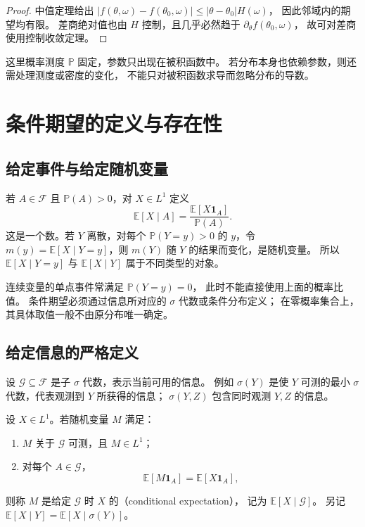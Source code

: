 \documentclass[UTF8]{ctexart}
\begin{document}
\begin{proof}
中值定理给出
$|f(\theta,\omega)-f(\theta_0,\omega)|\leq|\theta-\theta_0|H(\omega)$，
因此邻域内的期望均有限。
差商绝对值也由 $H$ 控制，且几乎必然趋于 $\partial_\theta f(\theta_0,\omega)$，
故可对差商使用控制收敛定理。
\end{proof}

这里概率测度 $\mathbb P$ 固定，参数只出现在被积函数中。
若分布本身也依赖参数，则还需处理测度或密度的变化，
不能只对被积函数求导而忽略分布的导数。

\section{条件期望的定义与存在性}
\label{sec:conditional-definition}

\subsection{给定事件与给定随机变量}

若 $A\in\mathcal F$ 且 $\mathbb P(A)>0$，对 $X\in L^1$ 定义
\[
  \mathbb E[X\mid A]
  =\frac{\mathbb E[X\mathbf1_A]}{\mathbb P(A)}.
\]
这是一个数。若 $Y$ 离散，对每个 $\mathbb P(Y=y)>0$ 的 $y$，令
$m(y)=\mathbb E[X\mid Y=y]$，则 $m(Y)$ 随 $Y$ 的结果而变化，是随机变量。
所以 $\mathbb E[X\mid Y=y]$ 与 $\mathbb E[X\mid Y]$ 属于不同类型的对象。

连续变量的单点事件常满足 $\mathbb P(Y=y)=0$，
此时不能直接使用上面的概率比值。
条件期望必须通过信息所对应的 $\sigma$ 代数或条件分布定义；
在零概率集合上，其具体取值一般不由原分布唯一确定。

\subsection{给定信息的严格定义}

设 $\mathcal G\subseteq\mathcal F$ 是子 $\sigma$ 代数，表示当前可用的信息。
例如 $\sigma(Y)$ 是使 $Y$ 可测的最小 $\sigma$ 代数，代表观测到 $Y$ 所获得的信息；
$\sigma(Y,Z)$ 包含同时观测 $Y,Z$ 的信息。

\begin{definition}[条件期望]
\label{def:conditional-expectation}
设 $X\in L^1$。若随机变量 $M$ 满足：
\begin{enumerate}
  \item $M$ 关于 $\mathcal G$ 可测，且 $M\in L^1$；
  \item 对每个 $A\in\mathcal G$，
  \begin{equation}
    \mathbb E[M\mathbf1_A]=\mathbb E[X\mathbf1_A],
    \label{eq:conditional-defining-identity}
  \end{equation}
\end{enumerate}
则称 $M$ 是给定 $\mathcal G$ 时 $X$ 的（conditional expectation），
记为 $\mathbb E[X\mid\mathcal G]$。
另记 $\mathbb E[X\mid Y]=\mathbb E[X\mid\sigma(Y)]$。
\end{definition}
\end{document}
